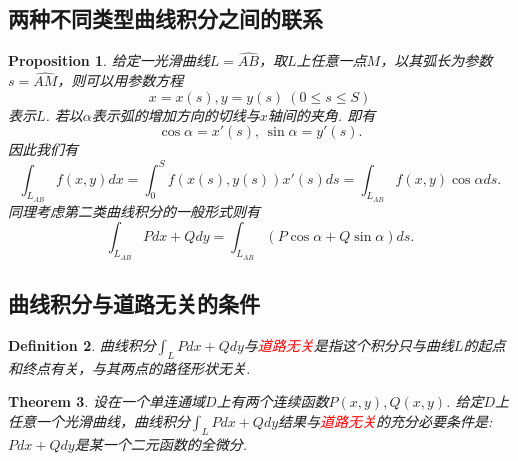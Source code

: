 \documentclass{article}
\newtheorem{theorem}{Theorem}[section]
\newtheorem{proposition}[theorem]{Proposition}
\newtheorem{definition}[theorem]{Definition}
\newcommand{\redt}[1]{\textcolor{red}{#1}}
\begin{document}
\subsection{两种不同类型曲线积分之间的联系}

\begin{proposition}
\rm 给定一光滑曲线$L=\widehat{AB}$，取$L$上任意一点$M$，以其弧长为参数$s=\widehat{AM}$，则可以用参数方程
$$
x=x(s),y=y(s) ~ (0 \leq s \leq S)
$$
表示$L$. 若以$\alpha$表示弧的增加方向的切线与$x$轴间的夹角. 即有
$$
\cos \alpha = x'(s), \, \sin \alpha = y'(s).
$$
因此我们有
$$
\int_{L_{AB}} f(x,y)dx = \int_0^S f(x(s),y(s))x'(s)ds = \int_{L_{AB}} f(x,y)\cos \alpha ds.
$$
同理考虑第二类曲线积分的一般形式则有
$$
\int_{L_{AB}}Pdx+Qdy = \int_{L_{AB}} (P\cos\alpha +Q\sin\alpha)ds.
$$
\end{proposition}

\newpage
\subsection{曲线积分与道路无关的条件}

\begin{definition}
\rm 曲线积分$\int_L Pdx + Qdy$与\redt{道路无关}是指这个积分只与曲线$L$的起点和终点有关，与其两点的路径形状无关. 
\end{definition}

\begin{theorem}\label{line-integral: path-independent}
\rm 设在一个单连通域$D$上有两个连续函数$P(x,y),Q(x,y)$. 给定$D$上任意一个光滑曲线，曲线积分$\int_L Pdx + Qdy$结果与\redt{道路无关}的充分必要条件是: $Pdx+Qdy$是某一个二元函数的全微分. 
\end{theorem}
\end{document}
